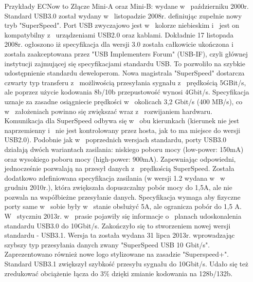 \documentclass{BscUS}
\begin{document}
Przykłady ECNow to
Złącze Mini-A oraz Mini-B: wydane w~ październiku 2000r.\cite{USB20Doc}
\newline
\indent Standard USB3.0 został wydany w~ listopadzie 2008r. definiując zupełnie nowy tryb "SuperSpeed". Port USB zwyczajowo jest w~ kolorze niebieskim i~ jest on kompatybilny z~ urządzeniami USB2.0 oraz kablami.
Dokładnie 17 listopada 2008r. ogłoszono iż specyfikacja dla wersji 3.0 została całkowicie ukończona i~ została zaakceptowana przez "USB Implementers Forum" (USB-IF), czyli głównej instytucji zajmującej się specyfikacjami standardu USB. To pozwoliło na szybkie udostępnienie standardu deweloperom.
Nowa magistrala "SuperSpeed" dostarcza czwarty typ transferu z~ możliwością przesyłania sygnału z~ prędkością 5GBit/s, ale poprzez użycie kodowania 8b/10b przepustowość wynosi 4Gbit/s. Specyfikacja uznaje za zasadne osiągniecie prędkości w~ okolicach 3,2 Gbit/s (400 MB/s), co w~ założeniach powinno się zwiększać wraz z~ rozwijaniem hardwaru. Komunikacja dla SuperSpeed odbywa się w~ obu kierunkach (kierunek nie jest naprzemienny i~ nie jest kontrolowany przez hosta, jak to ma miejsce do wersji USB2.0).
Podobnie jak w~ poprzednich wersjach standardu, porty USB3.0 działają dwóch wariantach zasilania: niskiego poboru mocy (low-power: 150mA) oraz wysokiego poboru mocy (high-power: 900mA). Zapewniając odpowiedni, jednocześnie pozwalają na przesył danych z~ prędkością SuperSpeed.
Została dodatkowo zdefiniowana specyfikacja zasilania (w wersji 1.2 wydana w~ w~ grudniu 2010r.), która zwiększała dopuszczalny pobór mocy do 1,5A, ale nie pozwala na współbieżne przesyłanie danych. Specyfikacja wymaga aby fizyczne porty same w~ sobie były w~ stanie obsłużyć 5A, ale ogranicza pobór do 1,5 A.
\cite{USB30Doc}
\newline
\indent W~ styczniu 2013r. w~ prasie pojawiły się informacje o~ planach udoskonalenia standardu USB3.0 do 10Gbit/s. Zakończyło się to stworzeniem nowej wersji standardu - USB3.1. Wersja ta została wydana 31 lipca 2013r. wprowadzając szybszy typ przesyłania danych zwany "SuperSpeed USB 10 Gbit/s". Zaprezentowano również nowe logo stylizowane na zasadzie "Superspeed+". Standard USB3.1 zwiększył szybkość przesyłu sygnału do 10Gbit/s. Udało się też zredukować obciążenie łącza do 3\% dzięki zmianie kodowania na 128b/132b.
\end{document}
